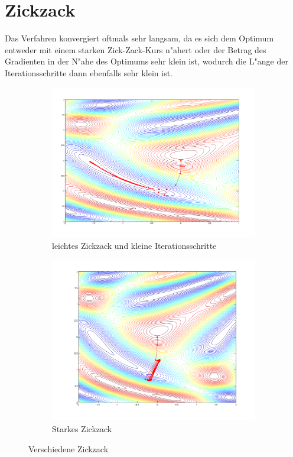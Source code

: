 \section{Zickzack}
Das Verfahren konvergiert oftmals sehr langsam, da es sich dem Optimum
entweder mit einem starken Zick-Zack-Kurs n"ahert oder der Betrag des
Gradienten in der N"ahe des Optimums sehr klein ist, wodurch die L"ange
der Iterationsschritte dann ebenfalls sehr klein ist.

\begin{figure}[htb]
\centering
\begin{subfigure}[b]{0.49\textwidth}
\centering
\includegraphics[width=\textwidth]{descent/zz_3.png}
\caption{leichtes Zickzack und kleine Iterationsschritte}
\end{subfigure} \begin{subfigure}[b]{0.49\textwidth}
\centering
\includegraphics[width=\textwidth]{descent/zz_2.png}
\caption{Starkes Zickzack}\label{zickzackb}
\end{subfigure}
\caption{Verschiedene Zickzack}\label{zickzack}
\end{figure}

